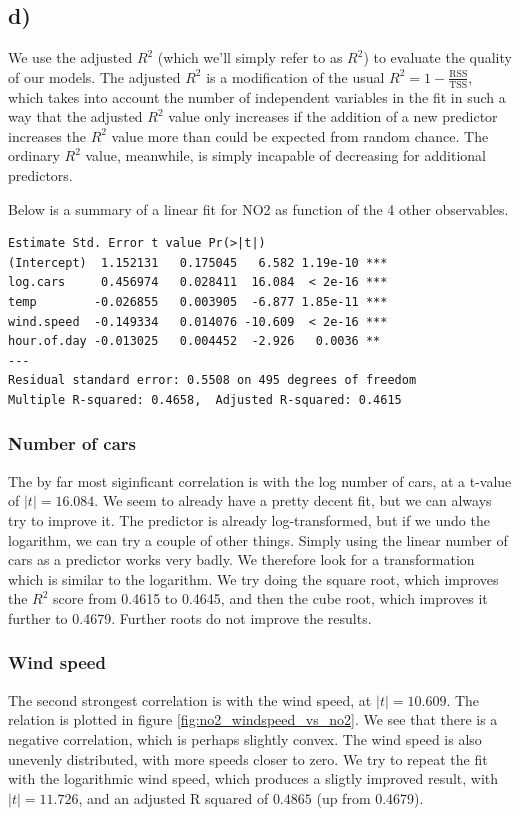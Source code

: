 \documentclass[a4paper, twocolumn]{article}
\begin{document}
\subsection*{d)}
We use the adjusted $R^2$ (which we'll simply refer to as $R^2$) to evaluate the quality of our models. The adjusted $R^2$ is a modification of the usual $R^2 = 1 - \frac{\mathrm{RSS}}{\mathrm{TSS}}$, which takes into account the number of independent variables in the fit in such a way that the adjusted $R^2$ value only increases if the addition of a new predictor increases the $R^2$ value more than could be expected from random chance. The ordinary $R^2$ value, meanwhile, is simply incapable of decreasing for additional predictors.

Below is a summary of a linear fit for NO2 as function of the 4 other observables.
\begin{Verbatim}[fontsize=\small]
    Estimate Std. Error t value Pr(>|t|)    
(Intercept)  1.152131   0.175045   6.582 1.19e-10 ***
log.cars     0.456974   0.028411  16.084  < 2e-16 ***
temp        -0.026855   0.003905  -6.877 1.85e-11 ***
wind.speed  -0.149334   0.014076 -10.609  < 2e-16 ***
hour.of.day -0.013025   0.004452  -2.926   0.0036 ** 
---
Residual standard error: 0.5508 on 495 degrees of freedom
Multiple R-squared: 0.4658,  Adjusted R-squared: 0.4615 
\end{Verbatim}
\subsubsection*{Number of cars}
The by far most siginficant correlation is with the log number of cars, at a t-value of $|t| = 16.084$. We seem to already have a pretty decent fit, but we can always try to improve it. The predictor is already log-transformed, but if we undo the logarithm, we can try a couple of other things. Simply using the linear number of cars as a predictor works very badly. We therefore look for a transformation which is similar to the logarithm. We try doing the square root, which improves the $R^2$ score from 0.4615 to 0.4645, and then the cube root, which improves it further to 0.4679. Further roots do not improve the results.


\subsubsection*{Wind speed}
The second strongest correlation is with the wind speed, at $|t| = 10.609$. The relation is plotted in figure \ref{fig:no2_windspeed_vs_no2}. We see that there is a negative correlation, which is perhaps slightly convex. The wind speed is also unevenly distributed, with more speeds closer to zero. We try to repeat the fit with the logarithmic wind speed, which produces a sligtly improved result, with $|t| = 11.726$, and an adjusted R squared of $0.4865$ (up from 0.4679).
\end{document}
